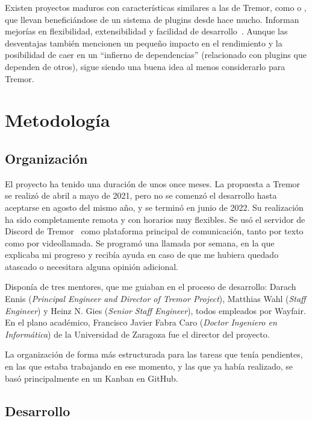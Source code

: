 Existen proyectos maduros con características similares a las de Tremor, como
 o , que llevan beneficiándose de un
sistema de plugins desde hace mucho. Informan mejorías en flexibilidad,
extensibilidad y facilidad de
desarrollo~\cite{nginxPluginsAdvantages}\cite{apachePluginsAdvantages}. Aunque
las desventajas también mencionen un pequeño impacto en el rendimiento y la
posibilidad de caer en un ``infierno de dependencias'' (relacionado con plugins
que dependen de otros), sigue siendo una buena idea al menos considerarlo para
Tremor.

\section{Metodología}

\subsection{Organización}

El proyecto ha tenido una duración de unos once meses. La propuesta a Tremor se
realizó de abril a mayo de 2021, pero no se comenzó el desarrollo hasta
aceptarse en agosto del mismo año, y se terminó en junio de 2022. Su realización
ha sido completamente remota y con horarios muy flexibles. Se usó el servidor de
Discord de Tremor~\cite{tremor_discord} como plataforma principal de
comunicación, tanto por texto como por videollamada. Se programó una llamada por
semana, en la que explicaba mi progreso y recibía ayuda en caso de que me
hubiera quedado atascado o necesitara alguna opinión adicional.

Disponía de tres mentores, que me guiaban en el proceso de desarrollo: Darach
Ennis (\emph{Principal Engineer and Director of Tremor Project}), Matthias Wahl
(\emph{Staff Engineer}) y Heinz N. Gies (\emph{Senior Staff Engineer}), todos
empleados por Wayfair. En el plano académico, Francisco Javier Fabra Caro
(\emph{Doctor Ingeniero en Informática}) de la Universidad de Zaragoza fue el
director del proyecto.

La organización de forma más estructurada para las tareas que tenía pendientes,
en las que estaba trabajando en ese momento, y las que ya había realizado, se
basó principalmente en un Kanban en
GitHub.

\subsection{Desarrollo}

